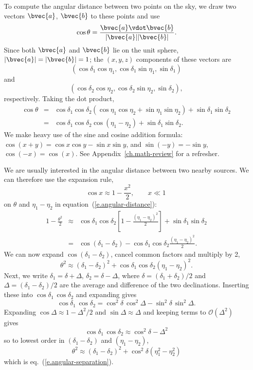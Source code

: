 \begin{sidebar}
\label{sb.angular-separation}
To compute the angular distance between two points on the sky, we draw two vectors $\bvec{a}$, $\bvec{b}$ to these points and use
\[ \cos\theta = \frac{\bvec{a}\vdot\bvec{b}}{|\bvec{a}||\bvec{b}|}. \]
Since both $\bvec{a}$ and $\bvec{b}$ lie on the unit sphere, $|\bvec{a}| = |\bvec{b}| = 1$; the $(x,y,z)$ components of these vectors are
\[
\left(\cos\delta_{1}\cos\eta_{1}, \cos\delta_{1}\sin\eta_{1}, \sin\delta_{1}\right)
\]
and
\[
\left(\cos\delta_{2}\cos\eta_{2}, \cos\delta_{2}\sin\eta_{2}, \sin\delta_{2}\right),
\]
respectively.
Taking the dot product,
\begin{eqnarray}
\cos\theta &=& \cos\delta_{1}\cos\delta_{2}\left(\cos\eta_{1}\cos\eta_{2} + 
	\sin\eta_{1}\sin\eta_{2}\right) + \sin\delta_{1}\sin\delta_{2}\nonumber\\
	 &=& \cos\delta_{1}\cos\delta_{2}\cos\left(\eta_{1}-\eta_{2}\right) + 
	 	\sin\delta_{1}\sin\delta_{2}.
\label{e.angular-distance}
\end{eqnarray}
We make heavy use of the sine and cosine addition formula: $\cos(x+y) = \cos x\cos y - \sin x\sin y$, and $\sin(-y) = -\sin y$, $\cos(-x) = \cos(x)$. See Appendix~\ref{ch.math-review} for a refresher.

We are usually interested in the angular distance between two nearby sources.  We can therefore use the expansion rule,
\[ \cos x \approx 1 - \frac{x^{2}}{2},\qquad x \ll 1 \, \]
on $\theta$ and $\eta_{1}-\eta_{2}$ in equation~(\ref{e.angular-distance}):
\begin{eqnarray*}
	1-\frac{\theta^{2}}{2} &\approx& \cos\delta_{1}\cos\delta_{2} \left[1-\frac{(\eta_{1}-\eta_{2})^{2}}{2}\right] + \sin\delta_{1}\sin\delta_{2}\\
		&=& \cos(\delta_{1}-\delta_{2}) - \cos\delta_{1}\cos\delta_{2}\frac{(\eta_{1}-\eta_{2})^{2}}{2}.
\end{eqnarray*}
We can now expand $\cos(\delta_{1}-\delta_{2})$, cancel common factors and multiply by 2,
\[ \theta^{2} \approx (\delta_{1}-\delta_{2})^{2} + \cos\delta_{1}\cos\delta_{2}(\eta_{1} - \eta_{2})^{2}. \]
Next, we write $\delta_{1} = \delta + \Delta$, $\delta_{2} = \delta - \Delta$, where $\delta = (\delta_{1}+\delta_{2})/2$ and $\Delta = (\delta_{1}-\delta_{2})/2$ are the average and difference of the two declinations. Inserting these into $\cos\delta_{1}\,\cos\delta_{2}$ and expanding gives
\[
	\cos\delta_{1}\,\cos\delta_{2} = \cos^{2}\delta\,\cos^{2}\Delta - \sin^{2}\delta\,\sin^{2}\Delta.
\]
Expanding $\cos\Delta\approx 1-\Delta^{2}/2$ and $\sin\Delta\approx \Delta$ and keeping terms to $\mathcal{O}(\Delta^{2})$ gives
\[
\cos\delta_{1}\,\cos\delta_{2} \approx \cos^{2}\delta - \Delta^{2}
\]
so to lowest order in $(\delta_{1}-\delta_{2})$ and $(\eta_{1}-\eta_{2})$,
\[
	\theta^{2} \approx (\delta_{1}-\delta_{2})^{2} + \cos^{2}\delta (\eta_{1}^{2}-\eta_{2}^{2})
\]
which is eq.~(\ref{e.angular-separation}).
\end{sidebar}
